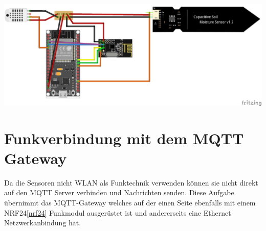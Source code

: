 \documentclass[
  12pt, %
  a4paper, %
  twoside, %
  openany, %
  numbers=noenddot, %
  BCOR=5mm, %
  parskip=half*, %
  thesis, %
]{bfhbook}
\begin{document}
  \begin{center}
    \includegraphics[width=17cm, left]{Bilder/Sensor-Design_Steckplatine.png}
    \captionsetup{justification=centering}
   \end{center}


 \section{Funkverbindung mit dem MQTT Gateway}
 Da die Sensoren nicht WLAN als Funktechnik verwenden können sie nicht direkt auf den MQTT Server verbinden und Nachrichten senden. Diese Aufgabe übernimmt das MQTT-Gateway welches auf der einen Seite ebenfalls mit einem NRF24\ref{nrf24} Funkmodul ausgerüstet ist und andererseits eine Ethernet Netzwerkanbindung hat.
 
\end{document}
